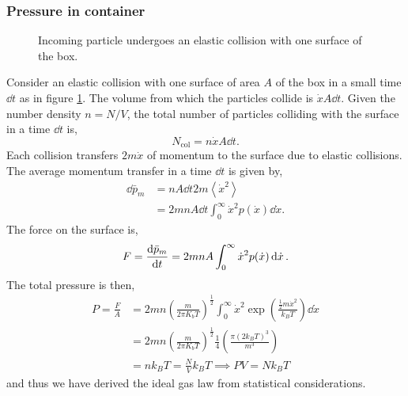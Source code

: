 \documentclass{book}
\begin{document}
\subsubsection{Pressure in container}
\begin{figure}
	\centering
	\usetikzlibrary{3d}
	\caption{Incoming particle undergoes an elastic collision with one surface of the box.}
	\label{fig:col}
\end{figure}
Consider an elastic collision with one surface of area $A$ of the box in a small time $\dd{t}$ as in figure \ref{fig:col}. The volume from which the particles collide is $\Dot{x}A\dd{t}$. Given the number density $n = N/V$, the total number of particles colliding with the surface in a time $\dd{t}$ is,
\begin{equation}
	N_{\text{col}} = n\Dot{x}A \dd{t}.
\end{equation}
Each collision transfers $2m\Dot{x}$ of momentum to the surface due to elastic collisions. The average momentum transfer in a time $\dd{t}$ is given by,
\begin{equation}
	\begin{split}
	\dd{\bar{p}_m} & = nA\dd{t}2m\left<\Dot{x}^2\right> \\
	& = 2mnA\dd{t} \int_0^{\infty} \Dot{x} ^2 p(\Dot{x})\dd{\Dot{x}}.
	\end{split}
\end{equation} 
The force on the surface is,
\begin{equation}
	F = \dv{\bar{p}_m}{t} = 2mnA \int_0^{\infty} \Dot{x} ^2 p(\Dot{x})\dd{\Dot{x}}.
\end{equation}
The total pressure is then,
\begin{equation}
	\begin{split}
		P = \frac{F}{A} & = 2mn\left(\frac{m}{2\pi K_bT}\right)^{\frac{1}{2}} \int_0^{\infty} \Dot{x}^2 \exp\left(\frac{\frac{1}{2}m\Dot{x}^2}{k_BT}\right) \dd{\Dot{x}} \\
		& = 2mn\left(\frac{m}{2\pi K_bT}\right)^{\frac{1}{2}} \frac{1}{4}\left(\frac{\pi(2k_BT)^3}{m^3}\right) \\
		& = nk_B T = \frac{N}{V}k_BT \implies \boxed{PV = Nk_B T}
	\end{split}
\end{equation}
and thus we have derived the ideal gas law from statistical considerations.
\end{document}
